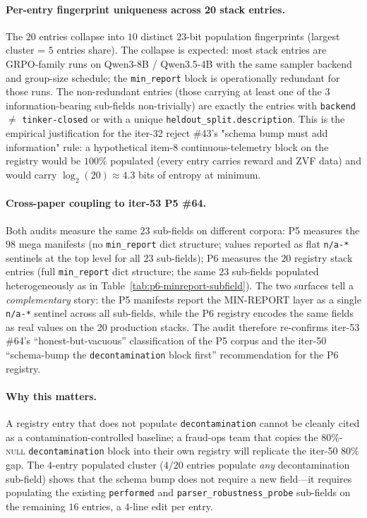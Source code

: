 \documentclass{article}
\begin{document}
\paragraph{Per-entry fingerprint uniqueness across 20 stack entries.}
The $20$ entries collapse into $10$ distinct $23$-bit population
fingerprints (largest cluster = $5$ entries share). The collapse is
expected: most stack entries are GRPO-family runs on Qwen3-8B / Qwen3.5-4B
with the same sampler backend and group-size schedule; the
\texttt{min\_report} block is operationally redundant for those runs.
The non-redundant entries (those carrying at least one of the $3$
information-bearing sub-fields non-trivially) are exactly the entries
with \texttt{backend} $\ne$ \texttt{tinker-closed} or with a unique
\texttt{heldout\_split.description}. This is the empirical justification
for the iter-32 reject \#43's "schema bump must add information" rule:
a hypothetical item-$8$ continuous-telemetry block on the registry
would be $100\%$ populated (every entry carries reward and ZVF data)
and would carry $\log_2(20) \approx 4.3$ bits of entropy at minimum.

\paragraph{Cross-paper coupling to iter-53 P5 \#64.}
Both audits measure the same $23$ sub-fields on different corpora: P5
measures the $98$ mega manifests (no \texttt{min\_report} dict
structure; values reported as flat \texttt{n/a-*} sentinels at the
top level for all $23$ sub-fields); P6 measures the $20$ registry
stack entries (full \texttt{min\_report} dict structure; the same
$23$ sub-fields populated heterogeneously as in
Table~\ref{tab:p6-minreport-subfield}). The two surfaces tell a
\emph{complementary} story: the P5 manifests report the MIN-REPORT layer
as a single \texttt{n/a-*} sentinel across all sub-fields, while the
P6 registry encodes the same fields as real values on the $20$
production stacks. The audit therefore re-confirms iter-53 \#64's
``honest-but-vacuous'' classification of the P5 corpus and the iter-50
``schema-bump the \texttt{decontamination} block first''
recommendation for the P6 registry.

\paragraph{Why this matters.}
A registry entry that does not populate \texttt{decontamination} cannot
be cleanly cited as a contamination-controlled baseline; a fraud-ops
team that copies the $80\%$-\textsc{null} \texttt{decontamination}
block into their own registry will replicate the iter-50 $80\%$
gap. The $4$-entry populated cluster ($4/20$ entries populate
\emph{any} decontamination sub-field) shows that the schema bump does
not require a new field---it requires populating the existing
\texttt{performed} and \texttt{parser\_robustness\_probe} sub-fields
on the remaining $16$ entries, a $4$-line edit per entry.
\end{document}
